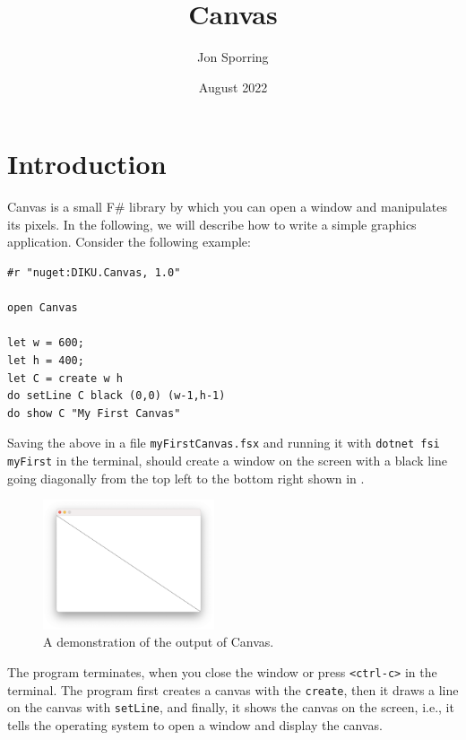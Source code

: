 \documentclass{article}
\title{Canvas}
\author{Jon Sporring}
\date{August 2022}
\begin{document}
\maketitle

\section{Introduction}
Canvas is a small F\# library by which you can open a window and manipulates its pixels. In the following, we will describe how to write a simple graphics application. Consider the following example:
\begin{lstlisting}
#r "nuget:DIKU.Canvas, 1.0"

open Canvas

let w = 600;
let h = 400;
let C = create w h
do setLine C black (0,0) (w-1,h-1)
do show C "My First Canvas"
\end{lstlisting}
Saving the above in a file \texttt{myFirstCanvas.fsx} and running it with \texttt{dotnet fsi myFirst} in the terminal, should create a window on the screen with a black line going diagonally from the top left to the bottom right shown in .
\begin{figure}
  \centering
  \includegraphics[width=0.45\textwidth]{myFirstCanvas}
  \caption{A demonstration of the output of Canvas.}
  \label{fig:myFirstCanvas}
\end{figure}
The program terminates, when you close the window or press \texttt{<ctrl-c>} in the terminal. The program first creates a canvas with the \lstinline{create}, then it draws a line on the canvas with \lstinline{setLine}, and finally, it shows the canvas on the screen, i.e., it tells the operating system to open a window and display the canvas.
\end{document}

